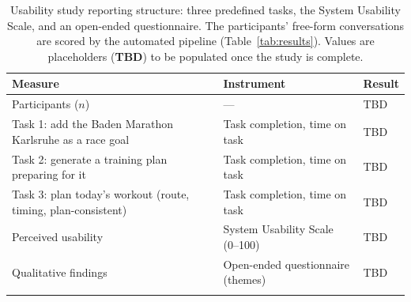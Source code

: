 \begin{table}[ht]
\begin{center}
\begin{minipage}{\textwidth}
\caption[Usability study results (placeholder)]{Usability study reporting structure: three predefined tasks, the System Usability Scale, and an open-ended questionnaire. The participants' free-form conversations are scored by the automated pipeline (Table~\ref{tab:results}). Values are placeholders (\textbf{TBD}) to be populated once the study is complete.}\label{tab:usability}
\begin{tabularx}{\textwidth}{Xll}
\toprule
\textbf{Measure} & \textbf{Instrument} & \textbf{Result} \\
\midrule
Participants ($n$) & --- & TBD \\
\addlinespace
Task 1: add the Baden Marathon Karlsruhe as a race goal & Task completion, time on task & TBD \\
Task 2: generate a training plan preparing for it & Task completion, time on task & TBD \\
Task 3: plan today's workout (route, timing, plan-consistent) & Task completion, time on task & TBD \\
\addlinespace
Perceived usability & System Usability Scale (0--100) & TBD \\
Qualitative findings & Open-ended questionnaire (themes) & TBD \\
\botrule
\end{tabularx}
\end{minipage}
\end{center}
\end{table}
